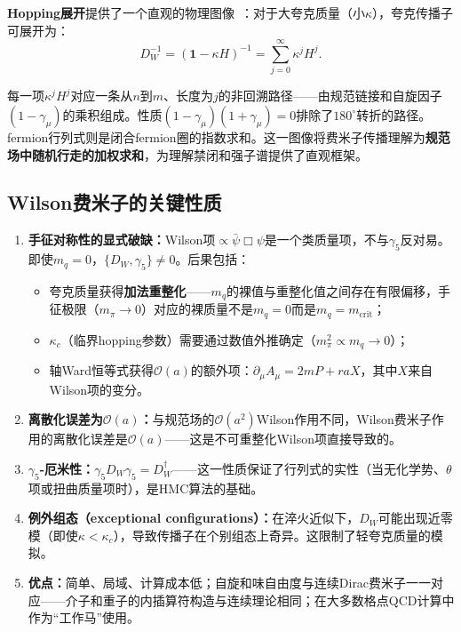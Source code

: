 \documentclass[12pt,a4paper]{ctexart}
\theoremstyle{definition}
\begin{document}
\textbf{Hopping展开}提供了一个直观的物理图像~\cite{GattringerLang2010}：对于大夸克质量（小$\kappa$），夸克传播子可展开为：
\begin{equation}
D_W^{-1} = (\mathbf{1} - \kappa H)^{-1} = \sum_{j=0}^\infty \kappa^j H^j.
\label{eq:hopping_expansion}
\end{equation}

每一项$\kappa^j H^j$对应一条从$n$到$m$、长度为$j$的非回溯路径——由规范链接和自旋因子$(1-\gamma_\mu)$的乘积组成。性质$(1-\gamma_\mu)(1+\gamma_\mu)=0$排除了$180^\circ$转折的路径。fermion行列式则是闭合fermion圈的指数求和。这一图像将费米子传播理解为\textbf{规范场中随机行走的加权求和}，为理解禁闭和强子谱提供了直观框架。

\subsection{Wilson费米子的关键性质}

\begin{enumerate}[leftmargin=*]
    \item \textbf{手征对称性的显式破缺：}Wilson项$\propto \bar\psi\Box\psi$是一个类质量项，不与$\gamma_5$反对易。即使$m_q=0$，$\{D_W, \gamma_5\} \neq 0$。后果包括：
    \begin{itemize}
        \item 夸克质量获得\textbf{加法重整化}——$m_q$的裸值与重整化值之间存在有限偏移，手征极限（$m_\pi \to 0$）对应的裸质量不是$m_q=0$而是$m_q = m_{\text{crit}}$；
        \item $\kappa_c$（临界hopping参数）需要通过数值外推确定（$m_\pi^2 \propto m_q \to 0$）；
        \item 轴Ward恒等式获得$\mathcal{O}(a)$的额外项：$\partial_\mu A_\mu = 2mP + raX$，其中$X$来自Wilson项的变分。
    \end{itemize}

    \item \textbf{离散化误差为$\mathcal{O}(a)$：}与规范场的$\mathcal{O}(a^2)$Wilson作用不同，Wilson费米子作用的离散化误差是$\mathcal{O}(a)$——这是不可重整化Wilson项直接导致的。

    \item \textbf{$\gamma_5$-厄米性：}$\gamma_5 D_W \gamma_5 = D_W^\dagger$——这一性质保证了行列式的实性（当无化学势、$\theta$项或扭曲质量项时），是HMC算法的基础。

    \item \textbf{例外组态（exceptional configurations）：}在淬火近似下，$D_W$可能出现近零模（即使$\kappa < \kappa_c$），导致传播子在个别组态上奇异。这限制了轻夸克质量的模拟。

    \item \textbf{优点：}简单、局域、计算成本低；自旋和味自由度与连续Dirac费米子一一对应——介子和重子的内插算符构造与连续理论相同；在大多数格点QCD计算中作为``工作马''使用。
\end{enumerate}
\end{document}
